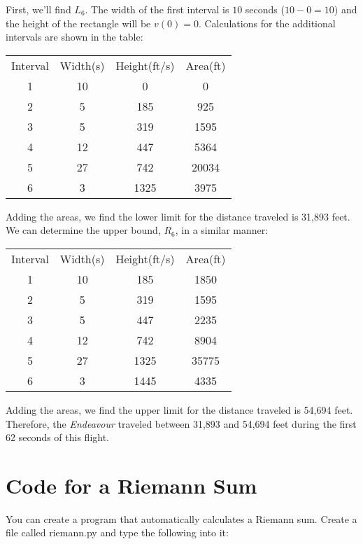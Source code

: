 First, we'll find $L_6$. The width of the first interval is $10$ seconds ($10-0=10$) and the height of the rectangle will be $v(0) = 0$. Calculations for the additional intervals are shown in the table:
\begin{center}
\begin{tabular}{c|c|c|c}
	Interval & Width(s) & Height(ft/s) & Area(ft) \\
	1 & 10 & 0 & 0 \\
	2 & 5 & 185 & 925 \\
	3 & 5 & 319 & 1595 \\
	4 & 12 & 447 & 5364 \\
	5 & 27 & 742 & 20034 \\
	6 & 3 & 1325 & 3975 \\
\end{tabular}
\end{center}

Adding the areas, we find the lower limit for the distance traveled is 31,893 feet. We can determine the upper bound, $R_6$, in a similar manner:
\begin{center}
\begin{tabular}{c|c|c|c}
	Interval & Width(s) & Height(ft/s) & Area(ft) \\
	1 & 10 & 185 & 1850 \\
	2 & 5 & 319 & 1595 \\
	3 & 5 & 447 & 2235 \\
	4 & 12 & 742 & 8904 \\
	5 & 27 & 1325 & 35775 \\
	6 & 3 & 1445 & 4335 \\
\end{tabular}
\end{center}
Adding the areas, we find the upper limit for the distance traveled is 54,694 feet. Therefore, the \textit{Endeavour} traveled between 31,893 and 54,694 feet during the first 62 seconds of this flight. 

\section{Code for a Riemann Sum}
You can create a program that automatically calculates a Riemann sum. Create a file called riemann.py 
and type the following into it:

